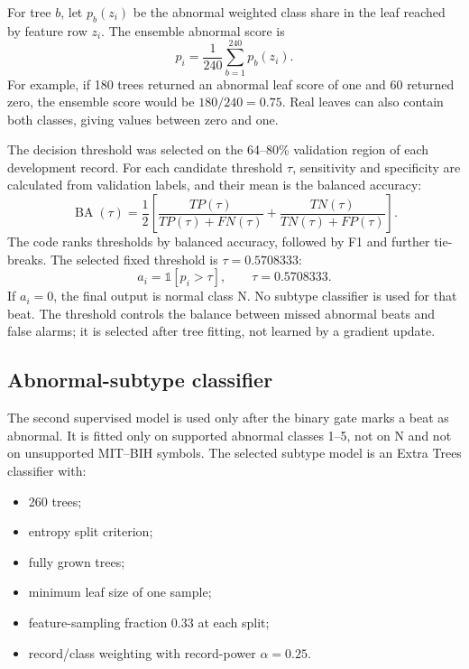 For tree $b$, let $p_b(z_i)$ be the abnormal weighted class share in the leaf
reached by feature row $z_i$. The ensemble abnormal score is
\begin{equation}
 p_i=\frac{1}{240}\sum_{b=1}^{240}p_b(z_i).
 \label{eq:method-binary-score}
\end{equation}
For example, if 180 trees returned an abnormal leaf score of one and 60
returned zero, the ensemble score would be $180/240=0.75$. Real leaves can
also contain both classes, giving values between zero and one.

The decision threshold was selected on the 64--80\% validation region of each
development record. For each candidate threshold $\tau$, sensitivity and
specificity are calculated from validation labels, and their mean is the
balanced accuracy:
\begin{equation}
 \operatorname{BA}(\tau)=\frac12\left[
 \frac{TP(\tau)}{TP(\tau)+FN(\tau)}+
 \frac{TN(\tau)}{TN(\tau)+FP(\tau)}\right].
 \label{eq:method-threshold-ba}
\end{equation}
The code ranks thresholds by balanced accuracy, followed by F1 and further
tie-breaks. The selected fixed threshold is $\tau=0.5708333$:
\begin{equation}
 a_i=\mathbb{1}[p_i>\tau],\qquad \tau=0.5708333.
\end{equation}
If $a_i=0$, the final output is normal class N. No subtype classifier is used
for that beat.
The threshold controls the balance between missed abnormal beats and false
alarms; it is selected after tree fitting, not learned by a gradient update.

\subsection{Abnormal-subtype classifier}

The second supervised model is used only after the binary gate marks a beat as
abnormal. It is fitted only on supported abnormal classes 1--5, not on N and
not on unsupported MIT--BIH symbols. The selected subtype model is an Extra
Trees classifier with:
\begin{itemize}
\item 260 trees;
\item entropy split criterion;
\item fully grown trees;
\item minimum leaf size of one sample;
\item feature-sampling fraction 0.33 at each split;
\item record/class weighting with record-power $\alpha=0.25$.
\end{itemize}

